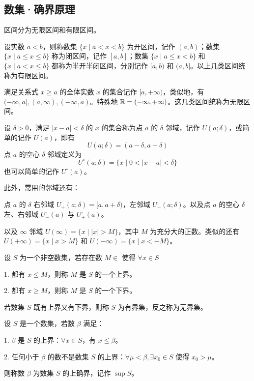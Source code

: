 \subsection{数集·确界原理}

区间分为无限区间和有限区间。

设实数 $a<b$，则称数集 $\{x \mid a<x<b\}$ 为开区间，记作 $(a,b)$；数集 $\{x \mid a\leqslant x \leqslant b\}$ 称为闭区间，记作 $[a,b]$；数集 $\{x \mid a\leqslant x<b\}$ 和 $\{x \mid a < x \leqslant b\}$ 都称为半开半闭区间，分别记作 $[a,b)$ 和 $(a,b]$。以上几类区间统称为有限区间。

满足关系式 $x\geqslant a$ 的全体实数 $x$ 的集合记作 $[a,+\infty)$，类似地，有 $(-\infty,a],(a,\infty),(-\infty,a)$。特殊地 $\mathbb{R} = (-\infty,+\infty)$。这几类区间统称为无限区间。

设 $\delta > 0$，满足 $|x-a|<\delta$ 的 $x$ 的集合称为点 $a$ 的 $\delta$ 邻域，记作 $U(a;\delta)$，或简单的记作 $U(a)$，即有
$$U(a;\delta) = (a-\delta,a+\delta)$$
点 $a$ 的空心 $\delta$ 邻域定义为
$$U^\circ (a;\delta) = \{x \mid 0<|x-a|<\delta\}$$
也可以简单的记作 $U^\circ(a)$。

此外，常用的邻域还有：

点 $a$ 的 $\delta$ 右邻域 $U_+(a;\delta) = [a,a+\delta)$，左邻域 $U_-(a;\delta)$。以及点 $a$ 的空心 $\delta$ 左、右邻域 $U_{-}^\circ(a)$ 与 $U_{+}^{\circ}(a)$。

以及 $\infty$ 邻域 $U(\infty) = \{x \mid |x|>M\}$，其中 $M$ 为充分大的正数。类似的还有 $U(+\infty) = \{x \mid x>M\}$ 和 $U(-\infty) = \{x \mid x<-M\}$。

\begin{definition}[有界集]
	设 $S$ 为一个非空数集，若存在数 $M\in$ 使得 $\forall x\in S$
	
	1. 都有 $x\leqslant M$，则称 $M$ 是 $S$ 的一个上界。
	
	2. 都有 $x\geqslant M$，则称 $M$ 是 $S$ 的一个下界。
\end{definition}

若数集 $S$ 既有上界又有下界，则称 $S$ 为有界集，反之称为无界集。

\begin{definition}[上确界]
	设 $S$ 是一个数集，若数 $\beta$ 满足：
	
	1. $\beta$ 是 $S$ 的上界：$\forall x\in S$，有 $x\leqslant \beta$。
	
	2. 任何小于 $\beta$ 的数不是数集 $S$ 的上界：$\forall \mu<\beta, \exists x_0\in S$ 使得 $x_0>\mu$。
	
	则称数 $\beta$ 为数集 $S$ 的上确界，记作 $\sup S$。
\end{definition}


